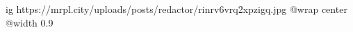  
 
 
 
 

\ifcmt
  ig https://mrpl.city/uploads/posts/redactor/rinrv6vrq2xpzigq.jpg
  @wrap center
  @width 0.9
\fi
